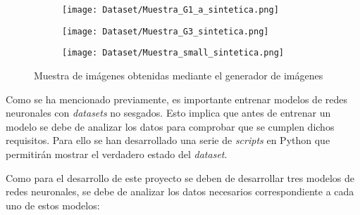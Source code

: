 \begin{figure}[ht]
	\ContinuedFloat
	\centering
	\begin{subfigure}[b]{0.3\linewidth}
		\texttt{[image: Dataset/Muestra\_G1\_a\_sintetica.png]}
	\end{subfigure}
	\begin{subfigure}[b]{0.3\linewidth}
		\texttt{[image: Dataset/Muestra\_G3\_sintetica.png]}
	\end{subfigure}
	\begin{subfigure}[b]{0.3\linewidth}
		\texttt{[image: Dataset/Muestra\_small\_sintetica.png]}
	\end{subfigure}
	\caption{Muestra de imágenes obtenidas mediante el generador de imágenes}
	\label{chap:Generación de un dataset fig:Muestras BlenderProc}

\end{figure}

Como se ha mencionado previamente, es importante entrenar modelos de redes neuronales con \textit{datasets} no sesgados. Esto implica que antes de entrenar un modelo se debe de analizar los datos para comprobar que se cumplen dichos requisitos. Para ello se han desarrollado una serie de \textit{scripts} en Python que permitirán mostrar el verdadero estado del \textit{dataset}.

Como para el desarrollo de este proyecto se deben de desarrollar tres modelos de redes neuronales, se debe de analizar los datos necesarios correspondiente a cada uno de estos modelos:

